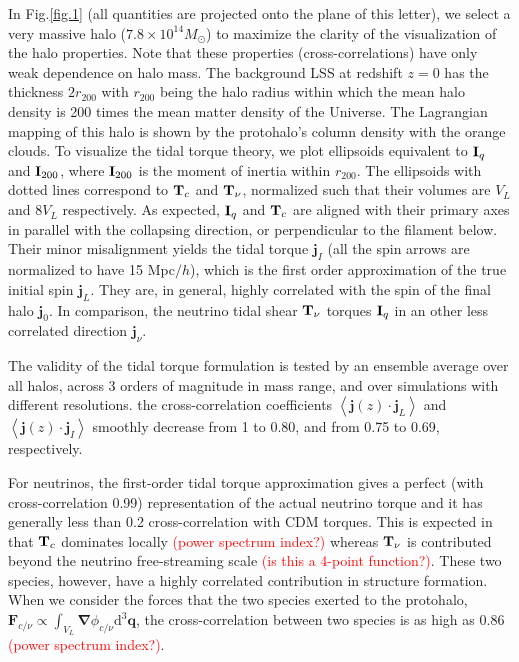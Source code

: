 \documentclass[aps,prd,twocolumn,amsmath,amssymb,amsfont,superscriptaddress]{revtex4-1}
\newcommand{\bs}{\boldsymbol}
\newcommand{\diff}{{\mathrm d}}
\newcommand{\T}{\bold{T}}
\newcommand{\I}{\bold{I}}
\newcommand{\spin}{\bs{j}}
\newcommand{\tcr}{\textcolor{red}}
\begin{document}
In Fig.\ref{fig.1} (all quantities are projected onto the plane of this letter), 
we select a very massive halo ($7.8\times 10^{14}M_\odot$) to maximize the clarity of the visualization of the halo properties.
Note that these properties (cross-correlations) have only weak dependence on halo mass. 
The background LSS at redshift $z=0$ has the thickness $2r_{200}$ with $r_{200}$ being the halo radius within which the mean halo density is 200 times the mean matter density of the Universe.
The Lagrangian mapping of this halo is shown by the protohalo's column density with the orange clouds.
To visualize the tidal torque theory, we plot ellipsoids equivalent to $\I_q$ and 
$\I_{200}$, where $\I_{200}$ is the moment of inertia within $r_{200}$. 
The ellipsoids with dotted lines correspond to $\T_c$ and $\T_\nu$, normalized such that their volumes are $V_L$ and $8V_L$ respectively. 
As expected, $\I_q$ and $\T_c$ are aligned with their primary axes in parallel with the collapsing direction, or perpendicular to the filament below. 
Their minor misalignment yields the tidal torque $\spin_I$ (all the spin arrows are normalized to have 15 Mpc$/h$), which is the first order approximation of the true initial spin $\spin_L$. 
They are, in general, highly correlated with the spin of the final halo $\spin_0$.
In comparison, the neutrino tidal shear $\T_\nu$ torques $\I_q$ in an other less correlated direction $\spin_\nu$.

The validity of the tidal torque formulation is tested by an ensemble average over all halos, 
across 3 orders of magnitude in mass range, and over simulations with different resolutions.
the cross-correlation coefficients $\left\langle \spin(z) \cdot \spin_L \right\rangle$ and
$\left\langle \spin(z) \cdot \spin_I \right\rangle$ smoothly decrease from 1 to 0.80, and
from 0.75 to 0.69, respectively.

For neutrinos, the first-order tidal torque approximation gives a perfect (with cross-correlation 0.99) representation of the actual neutrino torque and it has generally less than 0.2 cross-correlation with CDM torques. This is expected in that $\T_c$ dominates locally \tcr{(power spectrum index?)} whereas $\T_\nu$ is contributed beyond the neutrino free-streaming scale \tcr{(is this a 4-point function?)}. These two species, however, have a highly correlated contribution in structure formation. When we consider the forces that the two species exerted to the protohalo, $\bs{F}_{c/\nu}\propto\int_{V_L}\bs{\nabla}\phi_{c/\nu}\diff^3\bs{q}$, the cross-correlation between two species is as high as 0.86 \tcr{(power spectrum index?)}.
\end{document}
